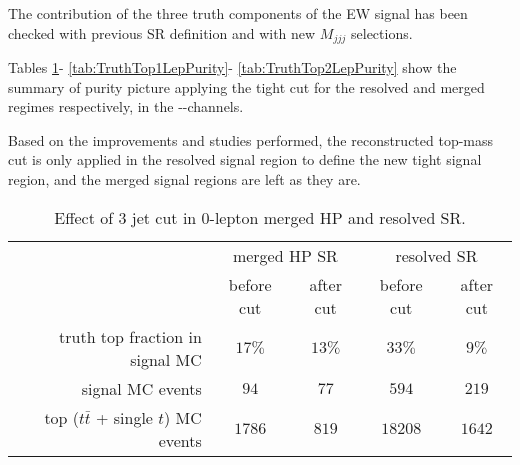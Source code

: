 The contribution of the three truth components of the EW signal has been checked with previous SR definition and with new $M_{jjj}$ selections. 

Tables
\ref{tab:0leptopMassTable}-
\ref{tab:TruthTop1LepPurity}-
\ref{tab:TruthTop2LepPurity}
show the summary of purity picture applying the tight cut for the resolved and merged regimes 
respectively, in the \zlep-\olep-\tlep channels.

Based on the improvements and studies performed, the reconstructed top-mass cut is only applied in the resolved signal region to define the new tight signal region, and the merged signal regions are left as they are.

\begin{table}[ht]
    \centering
    \begin{tabular}{r|c|c|c|c}
         & \multicolumn{2}{c|}{merged HP SR} & \multicolumn{2}{c}{resolved SR}\\
         & before cut & after cut & before cut & after cut\\
         \hline
         truth top fraction in signal MC & $17\%$ & $13\%$ &$33\%$ & $9\%$ \\
         signal MC events & $94$ & $77$ & $594$ & $219$ \\
         top ($t\bar t$ + single $t$) MC events & $1786$ & $819$ & $18208$ & $1642$ \\
        \end{tabular}
        \caption{Effect of 3 jet cut in 0-lepton merged HP and resolved SR.} 
        \label{tab:0leptopMassTable}
\end{table}


